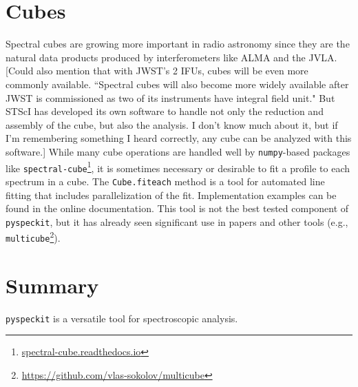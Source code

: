 \documentclass[twocolumn]{aastex61}
\newcommand{\pyspeckit}{\texttt{pyspeckit}\xspace}
\begin{document}
\section{Cubes}
Spectral cubes are growing more important in radio astronomy since they are the
natural data products produced by interferometers like ALMA and the JVLA. [Could 
also mention that with JWST's 2 IFUs, cubes will be even more commonly available.
``Spectral cubes will also become more widely available after JWST is commissioned as two of
its instruments have integral field unit." But STScI has developed its own software
to handle not only the reduction and assembly of the cube, but also the analysis.
I don't know much about it, but if I'm remembering something I heard correctly,
any cube can be analyzed with this software.]
While many cube operations are handled well by \texttt{numpy}-based packages
like \texttt{spectral-cube}\footnote{\url{spectral-cube.readthedocs.io}},
it is sometimes necessary or desirable to fit a profile to each spectrum
in a cube.  The \texttt{Cube.fiteach} method is a tool for automated line
fitting that includes parallelization of the fit. Implementation examples can be
found in the online documentation. This tool is not the best
tested component of \pyspeckit, but it has already seen significant use in
papers and other tools (e.g.,
\texttt{multicube}\footnote{\url{https://github.com/vlas-sokolov/multicube}}).

\section{Summary}
\texttt{pyspeckit} is a versatile tool for spectroscopic analysis.


\end{document}
